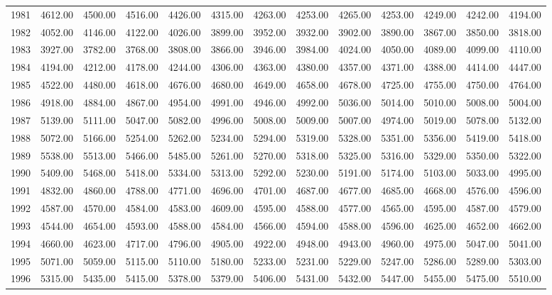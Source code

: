 \begin{longtable}{rrrrrrrrrrrrr}
  1981 & 4612.00 & 4500.00 & 4516.00 & 4426.00 & 4315.00 & 4263.00 & 4253.00 & 4265.00 & 4253.00 & 4249.00 & 4242.00 & 4194.00 \\ 
  1982 & 4052.00 & 4146.00 & 4122.00 & 4026.00 & 3899.00 & 3952.00 & 3932.00 & 3902.00 & 3890.00 & 3867.00 & 3850.00 & 3818.00 \\ 
  1983 & 3927.00 & 3782.00 & 3768.00 & 3808.00 & 3866.00 & 3946.00 & 3984.00 & 4024.00 & 4050.00 & 4089.00 & 4099.00 & 4110.00 \\ 
  1984 & 4194.00 & 4212.00 & 4178.00 & 4244.00 & 4306.00 & 4363.00 & 4380.00 & 4357.00 & 4371.00 & 4388.00 & 4414.00 & 4447.00 \\ 
  1985 & 4522.00 & 4480.00 & 4618.00 & 4676.00 & 4680.00 & 4649.00 & 4658.00 & 4678.00 & 4725.00 & 4755.00 & 4750.00 & 4764.00 \\ 
  1986 & 4918.00 & 4884.00 & 4867.00 & 4954.00 & 4991.00 & 4946.00 & 4992.00 & 5036.00 & 5014.00 & 5010.00 & 5008.00 & 5004.00 \\ 
  1987 & 5139.00 & 5111.00 & 5047.00 & 5082.00 & 4996.00 & 5008.00 & 5009.00 & 5007.00 & 4974.00 & 5019.00 & 5078.00 & 5132.00 \\ 
  1988 & 5072.00 & 5166.00 & 5254.00 & 5262.00 & 5234.00 & 5294.00 & 5319.00 & 5328.00 & 5351.00 & 5356.00 & 5419.00 & 5418.00 \\ 
  1989 & 5538.00 & 5513.00 & 5466.00 & 5485.00 & 5261.00 & 5270.00 & 5318.00 & 5325.00 & 5316.00 & 5329.00 & 5350.00 & 5322.00 \\ 
  1990 & 5409.00 & 5468.00 & 5418.00 & 5334.00 & 5313.00 & 5292.00 & 5230.00 & 5191.00 & 5174.00 & 5103.00 & 5033.00 & 4995.00 \\ 
  1991 & 4832.00 & 4860.00 & 4788.00 & 4771.00 & 4696.00 & 4701.00 & 4687.00 & 4677.00 & 4685.00 & 4668.00 & 4576.00 & 4596.00 \\ 
  1992 & 4587.00 & 4570.00 & 4584.00 & 4583.00 & 4609.00 & 4595.00 & 4588.00 & 4577.00 & 4565.00 & 4595.00 & 4587.00 & 4579.00 \\ 
  1993 & 4544.00 & 4654.00 & 4593.00 & 4588.00 & 4584.00 & 4566.00 & 4594.00 & 4588.00 & 4596.00 & 4625.00 & 4652.00 & 4662.00 \\ 
  1994 & 4660.00 & 4623.00 & 4717.00 & 4796.00 & 4905.00 & 4922.00 & 4948.00 & 4943.00 & 4960.00 & 4975.00 & 5047.00 & 5041.00 \\ 
  1995 & 5071.00 & 5059.00 & 5115.00 & 5110.00 & 5180.00 & 5233.00 & 5231.00 & 5229.00 & 5247.00 & 5286.00 & 5289.00 & 5303.00 \\ 
  1996 & 5315.00 & 5435.00 & 5415.00 & 5378.00 & 5379.00 & 5406.00 & 5431.00 & 5432.00 & 5447.00 & 5455.00 & 5475.00 & 5510.00 \\ 

\end{longtable}
